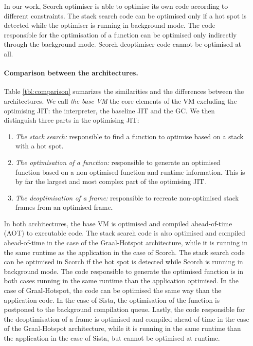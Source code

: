 \documentclass[a4paper,12pt,twoside]{../includes/ThesisStyle}
\begin{document}
In our work, Scorch optimiser is able to optimise its own code according to different constraints. The stack search code can be optimised only if a hot spot is detected while the optimiser is running in background mode. The code responsible for the optimisation of a function can be optimised only indirectly through the background mode. Scorch deoptimiser code cannot be optimised at all. 

\paragraph{Comparison between the architectures.}Table \ref{tbl:comparison} sumarizes the similarities and the differences between the architectures. We call \emph{the base VM} the core elements of the VM excluding the optimising JIT: the interpreter, the baseline JIT and the GC. We then distinguish three parts in the optimising JIT:
\begin{enumerate}
	\item \emph{The stack search:} responsible to find a function to optimise based on a stack with a hot spot.
	\item \emph{The optimisation of a function:} responsible to generate an optimised function-based on a non-optimised function and runtime information. This is by far the largest and most complex part of the optimising JIT.
	\item \emph{The deoptimisation of a frame:} responsible to recreate non-optimised stack frames from an optimised frame. 
\end{enumerate}
In both architectures, the base VM is optimised and compiled ahead-of-time (AOT) to executable code. The stack search code is also optimised and compiled ahead-of-time in the case of the Graal-Hotspot architecture, while it is running in the same runtime as the application in the case of Scorch. The stack search code can be optimised in Scorch if the hot spot is detected while Scorch is running in background mode. The code responsible to generate the optimised function is in both cases running in the same runtime than the application optimised. In the case of Graal-Hotspot, the code can be optimised the same way than the application code. In the case of Sista, the optimisation of the function is postponed to the background compilation queue. Lastly, the code responsible for the deoptimisation of a frame is optimised and compiled ahead-of-time in the case of the Graal-Hotspot architecture, while it is running in the same runtime than the application in the case of Sista, but cannot be optimised at runtime.
\end{document}
